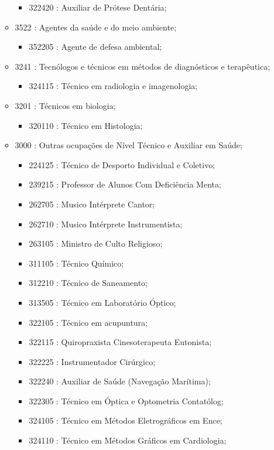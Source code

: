\begin{itemize}
\begin{itemize}
\begin{itemize}
      \item 322420 : Auxiliar de Prótese Dentária;
    \end{itemize}
    \item 3522 : Agentes da saúde e do meio ambiente;
    \begin{itemize}
      \item 352205 : Agente de defesa ambiental;
    \end{itemize}
    \item 3241 : Tecnólogos e técnicos em métodos de diagnósticos e terapêutica;
    \begin{itemize}
      \item 324115 : Técnico em radiologia e imagenologia;
    \end{itemize}
    \item 3201 : Técnicos em biologia;
    \begin{itemize}
      \item 320110 : Técnico em Histologia;
    \end{itemize}
    \item 3000 : Outras ocupações de Nível Técnico e Auxiliar em Saúde;
    \begin{itemize}
      \item 224125 : Técnico de Desporto Individual e Coletivo;
      \item 239215 : Professor de Alunos Com Deficiência Menta;
      \item 262705 : Musico Intérprete Cantor;
      \item 262710 : Musico Intérprete Instrumentista;
      \item 263105 : Ministro de Culto Religioso;
      \item 311105 : Técnico Químico;
      \item 312210 : Técnico de Saneamento;
      \item 313505 : Técnico em Laboratório Óptico;
      \item 322105 : Técnico em acupuntura;
      \item 322115 : Quiropraxista Cinesoterapeuta Eutonista;
      \item 322225 : Instrumentador Cirúrgico;
      \item 322240 : Auxiliar de Saúde (Navegação Marítima);
      \item 322305 : Técnico em Óptica e Optometria Contatólog;
      \item 324105 : Técnico em Métodos Eletrográficos em Ence;
      \item 324110 : Técnico em Métodos Gráficos em Cardiologia;

\end{itemize}
\end{itemize}
\end{itemize}
